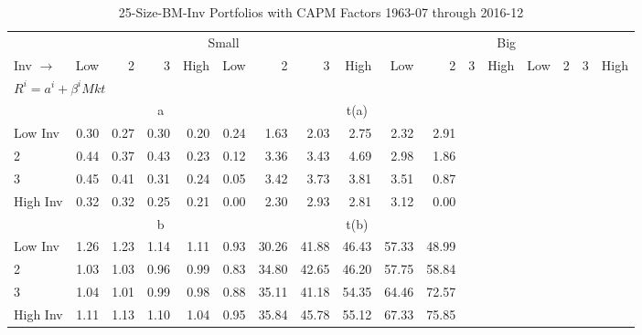 
\begin{table}[!ht]
\centering
\caption{25-Size-BM-Inv Portfolios with CAPM Factors 1963-07 through 2016-12}
\begin{tabular}{lrrrrrrrrrrrrrrrr}
  \toprule
    & \multicolumn{8}{c}{Small} & \multicolumn{8}{c}{Big} \\
      \cmidrule(r){2-9} \cmidrule(r){10-17}
    Inv $\rightarrow$ & Low & 2 & 3 & High & Low & 2 & 3 & High & Low & 2 & 3 & High & Low & 2 & 3 & High \\ 
  \midrule
  \multicolumn{11}{l}{$R^i=a^i+\beta^iMkt$} \\

  
    
      & \multicolumn{5}{c}{a} & \multicolumn{5}{c}{t(a)}
    
    \\
      \cmidrule(r){2-5} \cmidrule(r){6-9} \cmidrule(r){10-13} \cmidrule(r){14-17}

    Low Inv   & 0.30  & 0.27  & 0.30  & 0.20  & 0.24  & 1.63  & 2.03  & 2.75  & 2.32  & 2.91  \\
           2  & 0.44  & 0.37  & 0.43  & 0.23  & 0.12  & 3.36  & 3.43  & 4.69  & 2.98  & 1.86  \\
           3  & 0.45  & 0.41  & 0.31  & 0.24  & 0.05  & 3.42  & 3.73  & 3.81  & 3.51  & 0.87  \\
    High Inv  & 0.32  & 0.32  & 0.25  & 0.21  & 0.00  & 2.30  & 2.93  & 2.81  & 3.12  & 0.00  \\

  
    
      & \multicolumn{5}{c}{b} & \multicolumn{5}{c}{t(b)}
    
    \\
      \cmidrule(r){2-5} \cmidrule(r){6-9} \cmidrule(r){10-13} \cmidrule(r){14-17}

    Low Inv   & 1.26  & 1.23  & 1.14  & 1.11  & 0.93  & 30.26  & 41.88  & 46.43  & 57.33  & 48.99  \\
           2  & 1.03  & 1.03  & 0.96  & 0.99  & 0.83  & 34.80  & 42.65  & 46.20  & 57.75  & 58.84  \\
           3  & 1.04  & 1.01  & 0.99  & 0.98  & 0.88  & 35.11  & 41.18  & 54.35  & 64.46  & 72.57  \\
    High Inv  & 1.11  & 1.13  & 1.10  & 1.04  & 0.95  & 35.84  & 45.78  & 55.12  & 67.33  & 75.85  \\

  

  \bottomrule
\end{tabular}
\label{tbl:25_Size_BM_Inv_CAPM}
\end{table}